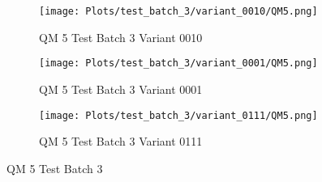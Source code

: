 \documentclass{DissertateFigs}
\begin{document}
\begin{figure}[t!]
\medskip

    \begin{subfigure}{0.47\textwidth}
    \texttt{[image: Plots/test\_batch\_3/variant\_0010/QM5.png]}
    \caption{QM 5 Test Batch 3 Variant 0010}
    \end{subfigure}
    \begin{subfigure}{0.47\textwidth}
    \texttt{[image: Plots/test\_batch\_3/variant\_0001/QM5.png]}
    \caption{QM 5 Test Batch 3 Variant 0001}
    \end{subfigure}

\medskip

    \begin{subfigure}{0.47\textwidth}
    \texttt{[image: Plots/test\_batch\_3/variant\_0111/QM5.png]}
    \caption{QM 5 Test Batch 3 Variant 0111}
    \end{subfigure}
\caption{QM 5 Test Batch 3}
    \end{figure}
\clearpage
\end{document}
